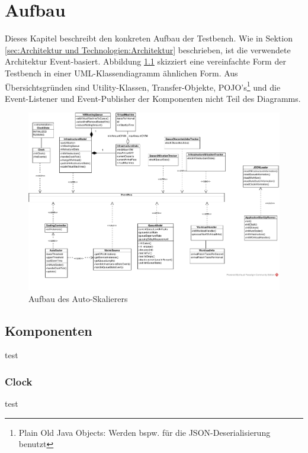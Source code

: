 \chapter{Aufbau}
\label{ch:Aufbau}
Dieses Kapitel beschreibt den konkreten Aufbau der Testbench. Wie in Sektion \ref{sec:Architektur und Technologien:Architektur} beschrieben, ist die verwendete Architektur Event-basiert. Abbildung \ref{fig:classDiagram} skizziert eine vereinfachte Form der Testbench in einer UML-Klassendiagramm ähnlichen Form. Aus Übersichtsgründen sind Utility-Klassen, Transfer-Objekte, POJO's\footnote{Plain Old Java Objects: Werden bspw. für die JSON-Deserialisierung benutzt} und die Event-Listener und Event-Publisher der Komponenten nicht Teil des Diagramms. 





\begin{figure}[t]
	\centering
	\begin{sideways}
		\includegraphics[width=20.0cm, trim={0cm 0cm 0cm 0cm}]{img/classDiagram.pdf}
	\end{sideways}
		\caption{Aufbau des Auto-Skalierers}
	\label{fig:classDiagram}
\end{figure}


\section{Komponenten}
test

\subsection{Clock}
test

